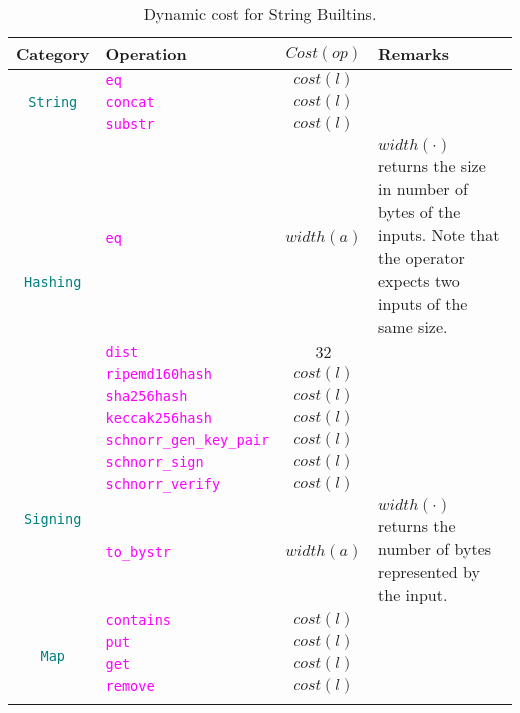 \documentclass[9pt]{article}
\begin{document}
\begin{table}[!hbt]
	\caption{Dynamic cost for String Builtins. \label{tab:string_builtins} }
\centering
	\begin{tabular}{|c|p{4.1cm}|c|p{5cm}|}
	\hline
		\textbf{Category} & \textbf{Operation} & \textbf{$Cost(op)$} & \textbf{Remarks} \\ \hline
		\multirow{3}{*}{\texttt{\textcolor{teal}{String}}} & \texttt{\textcolor{magenta}{eq}} & $cost(l)$  & \\
		\cline{2-4}
		 & \texttt{\textcolor{magenta}{concat}} & $cost(l)$  & \\ \cline{2-4}
		 & \texttt{\textcolor{magenta}{substr}} & $cost(l)$  & \\ \hline \hline
		\multirow{5}{*}{\texttt{\textcolor{teal}{Hashing}}} &
		  \texttt{\textcolor{magenta}{eq}} & $ width(a) $  & $width(\cdot)$
		  returns the size in number of bytes of the inputs. Note that the
		  operator expects two inputs of the same size.  \\ \cline{2-4}
		 & \texttt{\textcolor{magenta}{dist}} & $32$  & \\ \cline{2-4}
		 & \texttt{\textcolor{magenta}{ripemd160hash}} & $cost(l)$  & \\
		\cline{2-4}
		 & \texttt{\textcolor{magenta}{sha256hash}} & $cost(l)$  & \\ \cline{2-4}
		 & \texttt{\textcolor{magenta}{keccak256hash}} & $cost(l)$  & \\ \hline
		 \hline
		\multirow{4}{*}{\texttt{\textcolor{teal}{Signing}}} &
		\texttt{\textcolor{magenta}{schnorr\_gen\_key\_pair}} & $cost(l)$  & \\
		\cline{2-4}
		 & \texttt{\textcolor{magenta}{schnorr\_sign}} & $cost(l)$  & \\ \cline{2-4}
		 & \texttt{\textcolor{magenta}{schnorr\_verify}} & $cost(l)$  & \\
		 \cline{2-4}
		 & \texttt{\textcolor{magenta}{to\_bystr}} & $width(a)$  & $width(\cdot)$
		 returns
		 the number of
		 bytes represented
		 by the input.\\ \hline
		 \hline
		\multirow{6}{*}{\texttt{\textcolor{teal}{Map}}} &
		\texttt{\textcolor{magenta}{contains}} & $cost(l)$  & \\
		\cline{2-4}
		 & \texttt{\textcolor{magenta}{put}} & $cost(l)$  & \\ \cline{2-4}
		 & \texttt{\textcolor{magenta}{get}} & $cost(l)$  & \\ \cline{2-4}
		 & \texttt{\textcolor{magenta}{remove}} & $cost(l)$  & \\ \cline{2-4}

\end{tabular}
\end{table}
\end{document}

